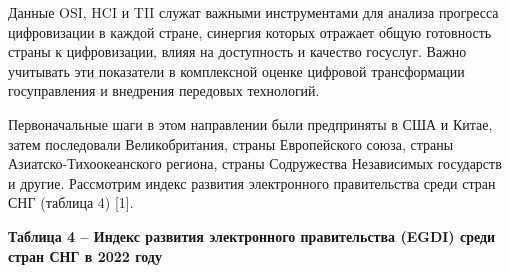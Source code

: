 {Данные OSI, HCI и TII служат важными инструментами для анализа прогресса
цифровизации в каждой стране, синергия которых отражает общую готовность
страны к цифровизации, влияя на доступность и качество госуслуг. Важно
учитывать эти показатели в комплексной оценке цифровой трансформации
госуправления и внедрения передовых технологий.

Первоначальные шаги в этом направлении были предприняты в США и Китае,
затем последовали Великобритания, страны Европейского союза, страны
Азиатско-Тихоокеанского региона, страны Содружества Независимых
государств и другие. Рассмотрим индекс развития электронного
правительства среди стран СНГ (таблица 4) {[}1{]}.

{\bfseries Таблица 4 -- Индекс развития электронного правительства (EGDI)
среди стран СНГ в 2022 году}

}
